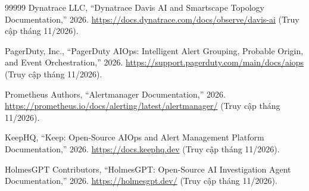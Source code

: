 \documentclass[a4paper,table]{article}
\theoremstyle{definition}
\begin{document}
\begin{thebibliography}{99999}
Dynatrace LLC, ``Dynatrace Davis AI and Smartscape Topology Documentation,'' 2026. \url{https://docs.dynatrace.com/docs/observe/davis-ai} (Truy cập tháng 11/2026).

PagerDuty, Inc., ``PagerDuty AIOps: Intelligent Alert Grouping, Probable Origin, and Event Orchestration,'' 2026. \url{https://support.pagerduty.com/main/docs/aiops} (Truy cập tháng 11/2026).

Prometheus Authors, ``Alertmanager Documentation,'' 2026. \url{https://prometheus.io/docs/alerting/latest/alertmanager/} (Truy cập tháng 11/2026).

KeepHQ, ``Keep: Open-Source AIOps and Alert Management Platform Documentation,'' 2026. \url{https://docs.keephq.dev} (Truy cập tháng 11/2026).

HolmesGPT Contributors, ``HolmesGPT: Open-Source AI Investigation Agent Documentation,'' 2026. \url{https://holmesgpt.dev/} (Truy cập tháng 11/2026).
\end{thebibliography}

\newpage
\appendix

\end{document}
